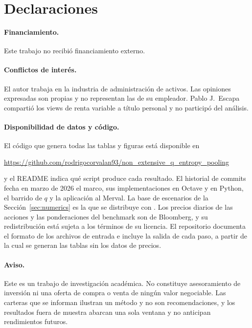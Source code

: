 \documentclass[11pt]{article}
\begin{document}
\section*{Declaraciones}

\paragraph{Financiamiento.} Este trabajo no recibi\'o financiamiento
externo.

\paragraph{Conflictos de inter\'es.} El autor trabaja en la industria de
administraci\'on de activos. Las opiniones expresadas son propias y no
representan las de su empleador. Pablo J.~Escapa comparti\'o los views de
renta variable a t\'itulo personal y no particip\'o del an\'alisis.

\paragraph{Disponibilidad de datos y c\'odigo.} El c\'odigo que genera todas
las tablas y figuras est\'a disponible en
\begin{center}
\url{https://github.com/rodrigocorvalan93/non_extensive_q_entropy_pooling}
\end{center}
y el README indica qu\'e script produce cada resultado. El historial de
commits fecha en marzo de 2026 el marco, sus implementaciones en Octave y
en Python, el barrido de $q$ y la aplicaci\'on al Merval. La base de escenarios
de la Secci\'on~\ref{sec:numerics} es la que se distribuye con
\citet{Meucci2008}. Los precios diarios de las acciones y las ponderaciones
del benchmark son de Bloomberg, y su redistribuci\'on est\'a sujeta a los
t\'erminos de su licencia. El repositorio documenta el formato de los
archivos de entrada e incluye la salida de cada paso, a partir de la cual
se generan las tablas sin los datos de precios.

\paragraph{Aviso.} Este es un trabajo de investigaci\'on acad\'emica. No
constituye asesoramiento de inversi\'on ni una oferta de compra o venta de
ning\'un valor negociable. Las carteras que se informan ilustran un m\'etodo y
no son recomendaciones, y los resultados fuera de muestra abarcan una sola
ventana y no anticipan rendimientos futuros.
\end{document}
